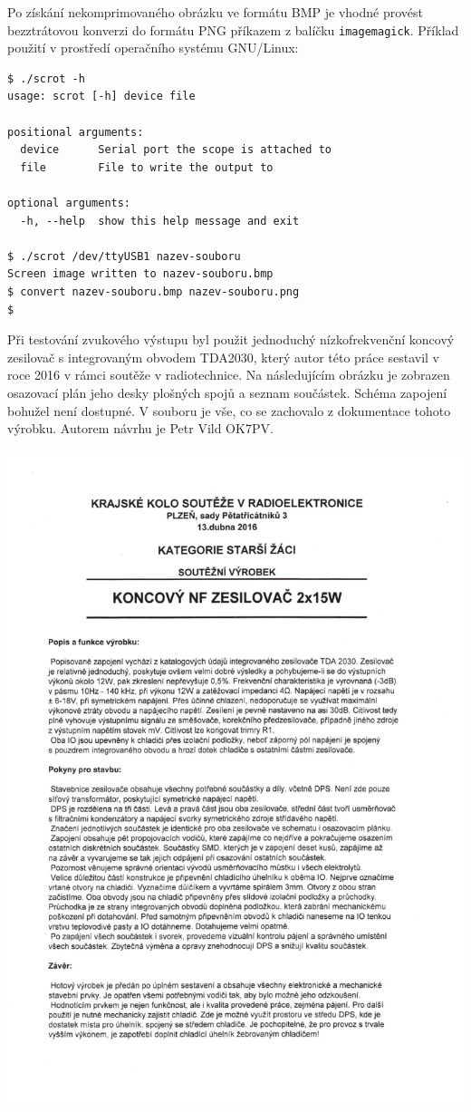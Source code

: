 Po získání nekomprimovaného obrázku ve formátu BMP je vhodné provést
bezztrátovou konverzi do formátu PNG příkazem  z balíčku
\texttt{imagemagick}.
Příklad použití v prostředí operačního systému GNU/Linux:
\begin{lstlisting}[style=terminal]
$ ./scrot -h
usage: scrot [-h] device file

positional arguments:
  device      Serial port the scope is attached to
  file        File to write the output to

optional arguments:
  -h, --help  show this help message and exit

$ ./scrot /dev/ttyUSB1 nazev-souboru
Screen image written to nazev-souboru.bmp
$ convert nazev-souboru.bmp nazev-souboru.png
$
\end{lstlisting}





\clearpage
{}
\label{app:TDA2030}
Při testování zvukového výstupu byl použit jednoduchý nízkofrekvenční koncový
zesilovač s integrovaným obvodem TDA2030, který autor této práce sestavil
v roce 2016 v rámci soutěže v radiotechnice. Na následujícím obrázku je
zobrazen osazovací plán jeho desky plošných spojů a seznam součástek. Schéma
zapojení bohužel není dostupné.
V souboru  je vše, co se zachovalo
z dokumentace tohoto výrobku. Autorem návrhu je Petr Vild OK7PV.

\noindent
\includegraphics[page=2, clip, bb=20mm 89mm 175mm 270mm, width=1.0\textwidth]{prilohy/TDA2030-dokumentace.pdf}
